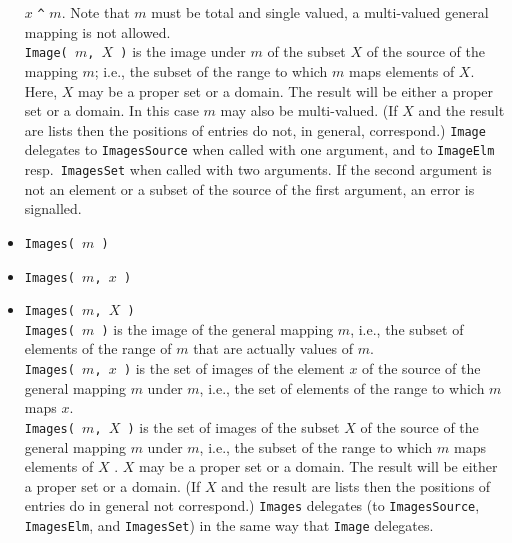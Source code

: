 \begin{itemize}
$x$ \verb.^. $m$. 
Note that $m$ must be total and single valued, a multi-valued general mapping is not
allowed.
\\[4pt]
{\tt Image( $m$, $X$ )} is the image under $m$ of the subset $X$ of the source of
the mapping $m$; i.e., the
subset of the range to which $m$ maps elements of $X$. Here, $X$ may be a proper set
or a domain. 
The result will be either a proper set or a domain. In this case $m$ may also be
multi-valued. 
(If $X$ and the result are lists then the positions of entries do not, in general, correspond.)
{\tt Image} delegates to {\tt ImagesSource} when called with one argument, and to
{\tt ImageElm} resp.~{\tt ImagesSet} when called with two arguments.
If the second argument is not an element or a subset of the source of the first
argument, an error is signalled. 
\item {\tt Images( $m$ )}
\item {\tt Images( $m$, $x$ )}
\item {\tt Images( $m$, $X$ )}\\
{\tt Images( $m$ )} is the image of the general mapping $m$, i.e., the subset of elements of the range of $m$
that are actually values of $m$.
\\[4pt]
{\tt Images( $m$, $x$ )} is the set of images of the element $x$ of the source of the general mapping $m$
under $m$, i.e., the set of elements of the range to which $m$ maps $x$.
\\[4pt]
{\tt Images( $m$, $X$ )} is the set of images of the subset $X$ of the source of the general mapping $m$ under
$m$, i.e., the subset of the range to which $m$ maps elements of $X$ . $X$ may be a proper set or a domain.
The result will be either a proper set or a domain. (If $X$ and the result are lists then the positions of
entries do in general not correspond.)
{\tt Images} delegates (to {\tt ImagesSource}, {\tt ImagesElm}, and {\tt ImagesSet}) in the
same way that {\tt Image} delegates.
\end{itemize}

\newpage

